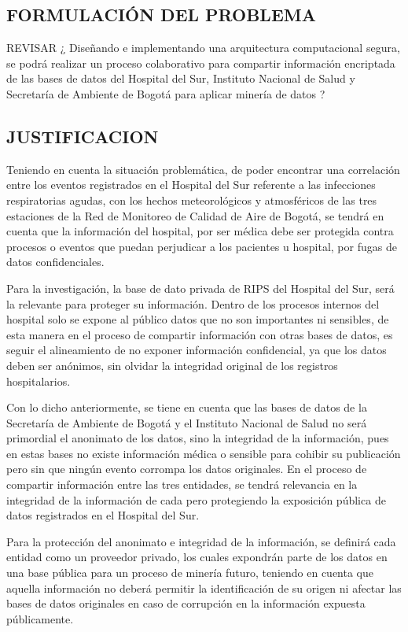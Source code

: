 \documentclass[a4paper, 11pt, oneside]{article}
\theoremstyle{definition}
\theoremstyle{remark}
\begin{document}
\subsection{FORMULACIÓN DEL PROBLEMA}

REVISAR
¿ Diseñando e implementando una arquitectura computacional segura, se podrá realizar un proceso colaborativo para compartir información encriptada de las bases de datos del Hospital del Sur, Instituto Nacional de Salud y Secretaría de Ambiente de Bogotá para aplicar minería de datos ?

\clearpage

\subsection{JUSTIFICACION}

Teniendo en cuenta la situación problemática, de poder encontrar una correlación entre los eventos registrados en el Hospital del Sur referente a las infecciones respiratorias agudas, con los hechos meteorológicos y atmosféricos de las tres estaciones de la Red de Monitoreo de Calidad de Aire de Bogotá, se tendrá en cuenta que la información del hospital, por ser médica debe ser protegida contra procesos o eventos que puedan perjudicar a los pacientes u hospital, por fugas de datos confidenciales. 

Para la investigación, la base de dato privada de RIPS del Hospital del Sur, será la relevante para proteger su información. Dentro de los procesos internos del hospital solo se expone al público datos que no son importantes ni sensibles, de esta manera en el proceso de compartir información con otras bases de datos, es seguir el alineamiento de no exponer información confidencial, ya que los datos deben ser anónimos, sin olvidar la integridad original de los registros hospitalarios.

Con lo dicho anteriormente, se tiene en cuenta que las bases de datos de la Secretaría de Ambiente de Bogotá y el Instituto Nacional de Salud no será primordial el anonimato de los datos, sino la integridad de la información, pues en estas bases no existe información médica o sensible para cohibir su publicación pero sin que ningún evento corrompa los datos originales. En el proceso de compartir información entre las tres entidades, se tendrá relevancia en la integridad de la información de cada pero protegiendo la exposición pública de datos registrados en el Hospital del Sur.

Para la protección del anonimato e integridad de la información, se definirá cada entidad como un proveedor privado, los cuales expondrán parte de los datos en una base pública para un proceso de minería futuro, teniendo en cuenta que aquella información no deberá permitir la identificación de su origen ni afectar las bases de datos originales en caso de corrupción en la información expuesta públicamente.
\end{document}
